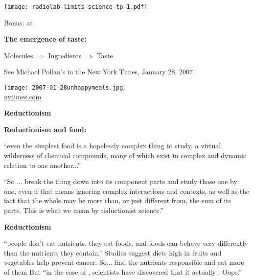 \begin{frame}[plain]
\begin{frame}[plain]
        \bigskip
    \texttt{[image: radiolab-limits-science-tp-1.pdf]}

    Bonus: 
    at \newline




  \textbf{The emergence of taste:}

  
    
     
      Molecules $\Rightarrow$ Ingredients $\Rightarrow$ Taste 
     
      See Michael Pollan's
       in the New York Times, January 28, 2007.

      \medskip

      \texttt{[image: 2007-01-28unhappymeals.jpg]}\\
      {\tiny \url{nytimes.com}}
    
  



  \textbf{Reductionism}

  \textbf{Reductionism and food:}
    
%     
     
      ``even the simplest food is a
      hopelessly complex thing to study, a virtual wilderness of chemical
      compounds, many of which exist in complex and dynamic relation to one
      another...''
    
      ``So ... break the
      thing down into its component parts and study those one by one, even
      if that means ignoring complex interactions and contexts, as well as
      the fact that the whole may be more than, or just different from, the
      sum of its parts. This is what we mean by reductionist science.''
    
  


  \textbf{Reductionism}

  
  
   ``people don't eat nutrients, they eat foods, and foods can behave
    very differently than the nutrients they contain.''
   Studies suggest diets high in fruits and vegetables help prevent cancer.
   So...  find the nutrients responsible and eat more of them
   But ``in the case of , scientists have discovered that it
    actually . Oops.''
  

\end{frame}
\end{frame}
